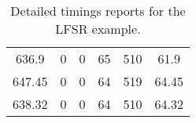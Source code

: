 \begin{table}[h]
{\begin{tabular}{cccccc}
            636.9              & 0                          & 0                          & 65                         & 510                        & 61.9                   \\
            647.45             & 0                          & 0                          & 64                         & 519                        & 64.45                  \\
            638.32             & 0                          & 0                          & 64                         & 510                        & 64.32                  \\
            \bottomrule
        \end{tabular}
    }
    \caption{Detailed timings reports for the LFSR example.}
\end{table}



